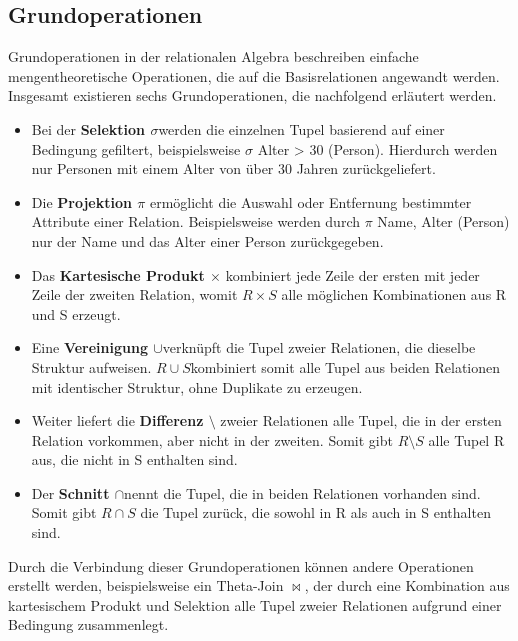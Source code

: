 \subsection{Grundoperationen} %
\label{sec:grundoperationen}
Grundoperationen in der relationalen Algebra beschreiben einfache mengentheoretische Operationen, die auf die Basisrelationen angewandt werden. Insgesamt existieren sechs Grundoperationen, die nachfolgend erläutert werden.
\begin{itemize}
\item Bei der \textbf{Selektion $\sigma$}werden die einzelnen Tupel basierend auf einer Bedingung gefiltert, beispielsweise \colorbox{gray!20}{$\sigma$ Alter > 30 (Person)}. Hierdurch werden nur Personen mit einem Alter von über 30 Jahren zurückgeliefert.
\item Die \textbf{Projektion $\pi$} ermöglicht die Auswahl oder Entfernung bestimmter Attribute einer Relation. Beispielsweise werden durch \colorbox{gray!20}{$\pi$ Name, Alter (Person)} nur der Name und das Alter einer Person zurückgegeben. 
\item Das \textbf{Kartesische Produkt $\times$} kombiniert jede Zeile der ersten mit jeder Zeile der zweiten Relation, womit  \colorbox{gray!20}{$R \times S$} alle möglichen Kombinationen aus \colorbox{gray!20}{R} und \colorbox{gray!20}{S} erzeugt.
\item Eine \textbf{Vereinigung $\cup$}verknüpft die Tupel zweier Relationen, die dieselbe Struktur aufweisen. \colorbox{gray!20}{$R \cup S$}kombiniert somit alle Tupel aus beiden Relationen mit identischer Struktur, ohne Duplikate zu erzeugen.
\item Weiter liefert die  \textbf{Differenz  $\setminus$} zweier Relationen alle Tupel, die in der ersten Relation vorkommen, aber nicht in der zweiten. Somit gibt 
 \colorbox{gray!20}{$R \setminus S$} alle Tupel \colorbox{gray!20}{R} aus, die nicht in \colorbox{gray!20}{S} enthalten sind.
\item Der \textbf{Schnitt $\cap$}nennt die Tupel, die in beiden Relationen vorhanden sind. Somit gibt \colorbox{gray!20}{$R \cap S$} die Tupel zurück, die sowohl in \colorbox{gray!20}{R} als auch in \colorbox{gray!20}{S} enthalten sind.
\end{itemize}
\noindent Durch die Verbindung dieser Grundoperationen können andere Operationen erstellt werden, beispielsweise ein Theta-Join $\bowtie$, der durch eine Kombination aus kartesischem Produkt und Selektion alle Tupel zweier Relationen aufgrund einer Bedingung zusammenlegt. \citep{rdb}


